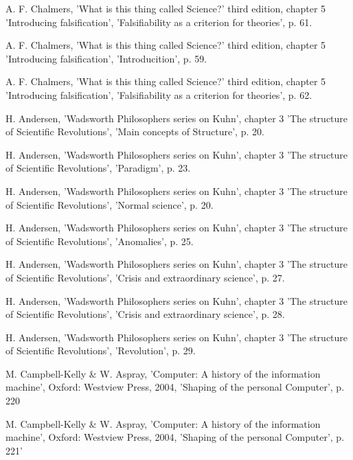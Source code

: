 \documentclass[paper=a4, fontsize=12pt]{scrartcl} %
\numberwithin{equation}{section} %
\numberwithin{figure}{section} %
\numberwithin{table}{section} %
\begin{document}
	\begin{thebibliography}{99}
		
		A. F. Chalmers, 'What is this thing called Science?' third edition, chapter 5 'Introducing falsification', 'Falsifiability as a criterion for theories', p. 61.
		
		A. F. Chalmers, 'What is this thing called Science?' third edition, chapter 5 'Introducing falsification', 'Introducition', p. 59.
		
		A. F. Chalmers, 'What is this thing called Science?' third edition, chapter 5 'Introducing falsification', 'Falsifiability as a criterion for theories', p. 62.
		
		H. Andersen, 'Wadsworth Philosophers series on Kuhn', chapter 3 'The structure of Scientific Revolutions', 'Main concepts of Structure', p. 20.
		
		H. Andersen, 'Wadsworth Philosophers series on Kuhn', chapter 3 'The structure of Scientific Revolutions', 'Paradigm', p. 23.
		
		H. Andersen, 'Wadsworth Philosophers series on Kuhn', chapter 3 'The structure of Scientific Revolutions', 'Normal science', p. 20.
		
		H. Andersen, 'Wadsworth Philosophers series on Kuhn', chapter 3 'The structure of Scientific Revolutions', 'Anomalies', p. 25.
		
		H. Andersen, 'Wadsworth Philosophers series on Kuhn', chapter 3 'The structure of Scientific Revolutions', 'Crisis and extraordinary science', p. 27.
		
		H. Andersen, 'Wadsworth Philosophers series on Kuhn', chapter 3 'The structure of Scientific Revolutions', 'Crisis and extraordinary science', p. 28.
		
		H. Andersen, 'Wadsworth Philosophers series on Kuhn', chapter 3 'The structure of Scientific Revolutions', 'Revolution', p. 29.
		
		M. Campbell-Kelly \& W. Aspray, 'Computer: A history of the information machine', Oxford: Westview Press, 2004, 'Shaping of the personal Computer', p. 220
		
		M. Campbell-Kelly \& W. Aspray, 'Computer: A history of the information machine', Oxford: Westview Press, 2004, 'Shaping of the personal Computer', p. 221'
		

\end{thebibliography}
\end{document}
